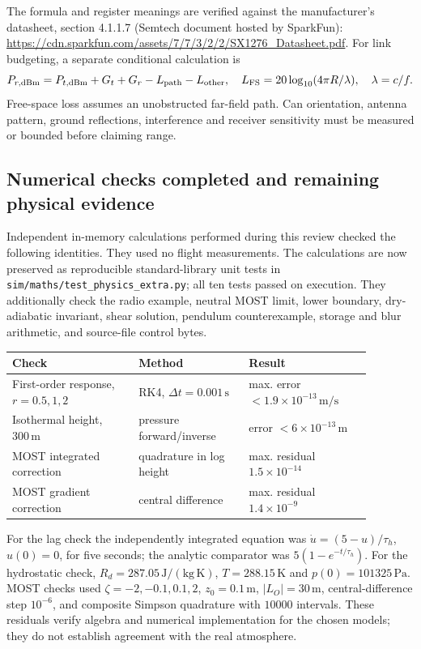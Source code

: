 \documentclass[11pt,a4paper]{article}
\numberwithin{equation}{section}
\begin{document}
The formula and register meanings are verified against the manufacturer's
datasheet, section 4.1.1.7 (Semtech document hosted by SparkFun):
\url{https://cdn.sparkfun.com/assets/7/7/3/2/2/SX1276_Datasheet.pdf}.
For link budgeting, a separate conditional calculation is
\begin{equation}
 P_{r,\rm dBm}=P_{t,\rm dBm}+G_t+G_r-L_{\rm path}-L_{\rm other},
 \quad L_{\rm FS}=20\log_{10}(4\pi R/\lambda),\quad \lambda=c/f.
\end{equation}
Free-space loss assumes an unobstructed far-field path. Can orientation,
antenna pattern, ground reflections, interference and receiver sensitivity
must be measured or bounded before claiming range.

\subsection{Numerical checks completed and remaining physical evidence}

Independent in-memory calculations performed during this review checked
the following identities. They used no flight measurements.
The calculations are now preserved as reproducible standard-library
unit tests in \texttt{sim/maths/test\_physics\_extra.py}; all ten tests
passed on execution. They additionally check the radio example, neutral
MOST limit, lower boundary, dry-adiabatic invariant, shear solution,
pendulum counterexample, storage and blur arithmetic, and source-file
control bytes.
\begin{center}
\begin{tabular}{p{0.31\linewidth}p{0.27\linewidth}p{0.30\linewidth}}
\toprule
Check & Method & Result\\
\midrule
First-order response, $r=0.5,1,2$ & RK4, $\Delta t=0.001\,\mathrm s$
 & max. error $<1.9\times10^{-13}\,\mathrm{m/s}$\\
Isothermal height, $300\,\mathrm m$ & pressure forward/inverse
 & error $<6\times10^{-13}\,\mathrm m$\\
MOST integrated correction & quadrature in log height
 & max. residual $1.5\times10^{-14}$\\
MOST gradient correction & central difference
 & max. residual $1.4\times10^{-9}$\\
\bottomrule
\end{tabular}
\end{center}
For the lag check the independently integrated equation was
$\dot u=(5-u)/\tau_h$, $u(0)=0$, for five seconds; the analytic comparator
was $5(1-e^{-t/\tau_h})$. For the hydrostatic check,
$R_d=287.05\,\mathrm{J/(kg\,K)}$, $T=288.15\,\mathrm K$ and
$p(0)=101325\,\mathrm{Pa}$. MOST checks used $\zeta=-2,-0.1,0.1,2$,
$z_0=0.1\,\mathrm m$, $|L_O|=30\,\mathrm m$, central-difference step
$10^{-6}$, and composite Simpson quadrature with $10000$ intervals.
These residuals verify algebra and numerical implementation for the chosen
models; they do not establish agreement with the real atmosphere.
\end{document}
